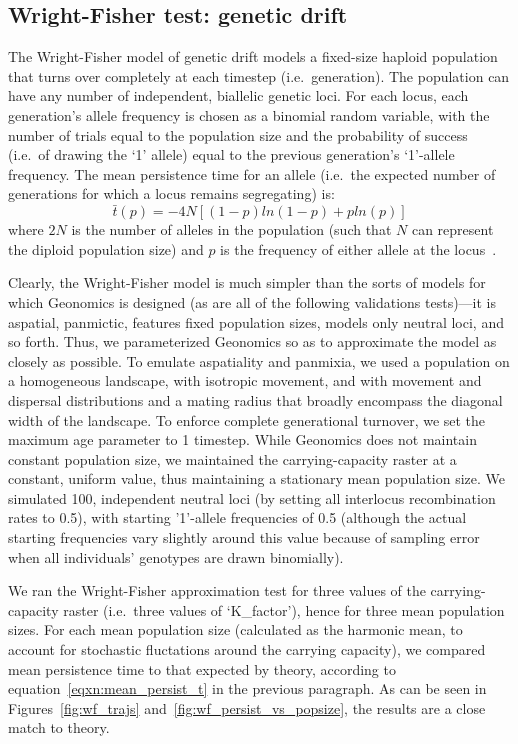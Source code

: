 ﻿\documentclass{article}
\begin{document}
\subsection{Wright-Fisher test: genetic drift}
The Wright-Fisher model of genetic drift models a fixed-size haploid population that
turns over completely at each timestep (i.e.\ generation).
The population can have any number of independent, biallelic genetic loci.
For each locus, each generation’s allele
frequency is chosen as a binomial random variable, with the number of trials equal to
the population size and the probability of success (i.e.\ of drawing the ‘1’ allele)
equal to the previous generation’s ‘1’-allele frequency.
The mean persistence time for an allele 
(i.e.\ the expected number of generations for which a locus remains segregating) 
is:
\begin{equation}
\bar{t}(p) = -4N[(1 - p)ln(1 - p) + pln(p)]
\label{eqxn:mean_persist_t}
\end{equation}
where $2N$ is the number of alleles in the population (such that $N$ can
represent the diploid population size) and $p$ is the frequency of either allele
at the locus~\cite{wright,fisher,hartl}.

Clearly, the Wright-Fisher model is much simpler than the sorts of models for which
Geonomics is designed (as are all of the following validations tests)---it is aspatial,
panmictic, features fixed population sizes, models only neutral loci, and so forth. 
Thus, we parameterized Geonomics so as to approximate the model as closely as possible.
To emulate aspatiality and panmixia, we used a population on a homogeneous landscape,
with isotropic movement, and with movement and dispersal distributions
and a mating radius that broadly encompass the diagonal width of the landscape.
To enforce complete generational turnover, we set the
maximum age parameter to 1 timestep. While Geonomics does not maintain constant population
size, we maintained the carrying-capacity raster at a constant, uniform value, thus
maintaining a stationary mean population size. We simulated 100, independent neutral
loci (by setting all interlocus recombination rates to 0.5), with starting '1'-allele
frequencies of 0.5 (although the actual starting frequencies vary slightly around
this value because of sampling error when all individuals' genotypes are drawn binomially).

We ran the Wright-Fisher approximation test for three values of the
carrying-capacity raster (i.e.\ three values of `K\_factor'), hence for three mean
population sizes. For each mean population size (calculated as the harmonic mean,
to account for stochastic fluctations around the carrying capacity), we compared
mean persistence time to that
expected by theory, according to equation~\ref{eqxn:mean_persist_t} in the previous paragraph. As can be
seen in Figures~\ref{fig:wf_trajs} and~\ref{fig:wf_persist_vs_popsize}, the results are a close match to theory.
\end{document}
